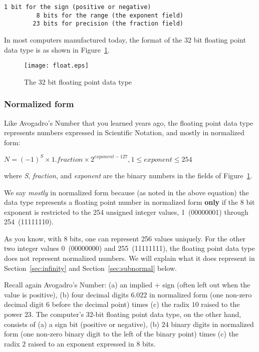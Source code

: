 \documentclass{patt}
\begin{document}
\begin{Verbatim}[fontsize=\fontsize{9}{14}\selectfont]
         1 bit for the sign (positive or negative)
         8 bits for the range (the exponent field)
        23 bits for precision (the fraction field)
\end{Verbatim}
In most computers manufactured today, the format of the 32 bit floating point
data type is as shown in Figure~\ref{fig:floating_point}. 

\begin{figure}
\centerline{\texttt{[image: float.eps]}}
\caption{The 32 bit floating point data type\label{fig:floating_point}}
\vspace{-12pt}
\end{figure}

\FloatBarrier

\subsubsection{Normalized form}

Like Avogadro's Number that you learned years ago, the floating point data
type represents numbers expressed in Scientific Notation, and mostly  
in normalized form:

\vspace{.25 in}
$N = (-1)^S \times 1.fraction \times 2 ^ {exponent - 127}  ,   1 \leq exponent
\leq 254 $
\vspace{.25 in}

\noindent
where {\em S}, {\em fraction}, and {\em exponent} are the binary numbers 
in the fields of Figure~\ref{fig:floating_point}.


We say {\em mostly} in normalized form because (as noted in the above 
equation) the data type represents a floating point number in normalized form 
{\bf only} if the 8 bit exponent is restricted to the 254 unsigned integer 
values, 1~(00000001) through 254~(11111110).  

As you know,
with 8 bits, one can represent 256 values uniquely.  For the other two 
integer values 
0~(00000000) and 255~(11111111), the floating point data type does not 
represent normalized numbers.  We will explain what it does represent 
in Section~\ref{sec:infinity} and Section~\ref{sec:subnormal} below.

Recall again Avogadro's Number: (a) an implied $+$ sign (often left out when
the value is positive), (b) four decimal digits $6.022$ in normalized
form (one non-zero decimal digit $6$ before the decimal point) times (c) the 
radix $10$ raised to the power $23$.  The computer's 32-bit floating point 
data type, on the other hand, 
consists of (a) a sign bit (positive or negative), (b) $24$ binary digits in 
normalized form (one non-zero binary digit to the left of the binary point) 
times (c) the radix $2$ raised to an exponent expressed in $8$ bits.   
\end{document}
